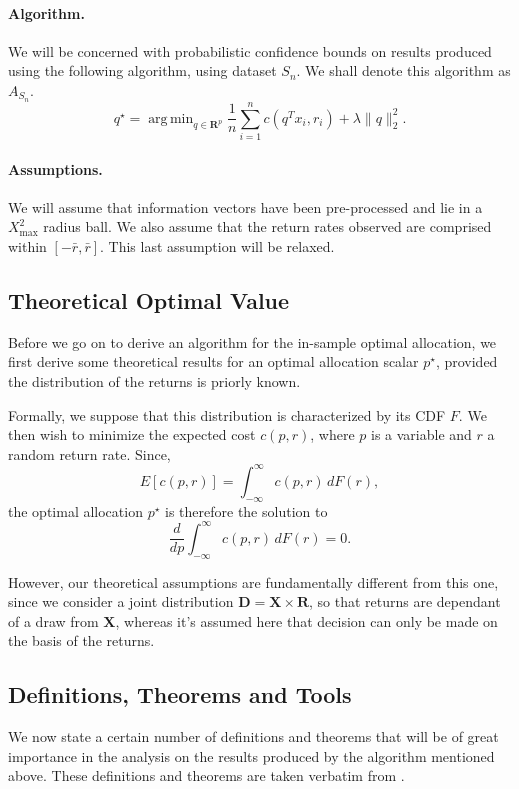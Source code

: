 \documentclass[11pt]{article}
\DeclareMathOperator*{\argmin}{arg\,min}
\newcommand{\real}{\bm R}
\theoremstyle{plain}
\theoremstyle{definition}
\begin{document}
\paragraph{Algorithm.}
We will be concerned with probabilistic confidence bounds on results produced using the
following algorithm, using dataset $S_n$. We shall denote this algorithm as $A_{S_n}$.
\begin{equation}
  \label{algo}
  q^\star = \argmin_{q\in\real^p}\frac{1}{n} \sum_{i=1}^{n} c(q^Tx_i,r_i) + \lambda\|q\|^2_2.
\end{equation}

\paragraph{Assumptions.}
We will assume that information vectors have been pre-processed and lie in a $X^2_{\max}$
radius ball. We also assume that the return rates observed are comprised within $[-\bar r,
\bar r]$. This last assumption will be relaxed. 


\subsection{Theoretical Optimal Value}

Before we go on to derive an algorithm for the in-sample optimal allocation, we first
derive some theoretical results for an optimal allocation scalar $p^\star$, provided the
distribution of the returns is priorly known. 

Formally, we suppose that this distribution is characterized by its CDF $F$. We then wish
to minimize the expected cost $c(p,r)$, where $p$ is a variable and $r$ a random return
rate. Since,
\begin{equation}
  E[c(p,r)] = \int_{-\infty}^{\infty} c(p,r)\,dF(r),
\end{equation}
the optimal allocation $p^\star$ is therefore the solution to
\begin{equation}
  \frac{d}{dp} \int_{-\infty}^{\infty} c(p,r)\,dF(r) = 0.
\end{equation}

However, our theoretical assumptions are fundamentally different from this one, since we
consider a joint distribution $\bm D= \bm X \times \bm R$, so that returns are dependant
of a draw from $\bm X$, whereas it's assumed here that decision can only be made on the
basis of the returns. 

\subsection{Definitions, Theorems and Tools}
We now state a certain number of definitions and theorems that will be of great importance
in the analysis on the results produced by the algorithm mentioned above. These
definitions and theorems are taken verbatim from \cite{bousquet2002}.
\end{document}
